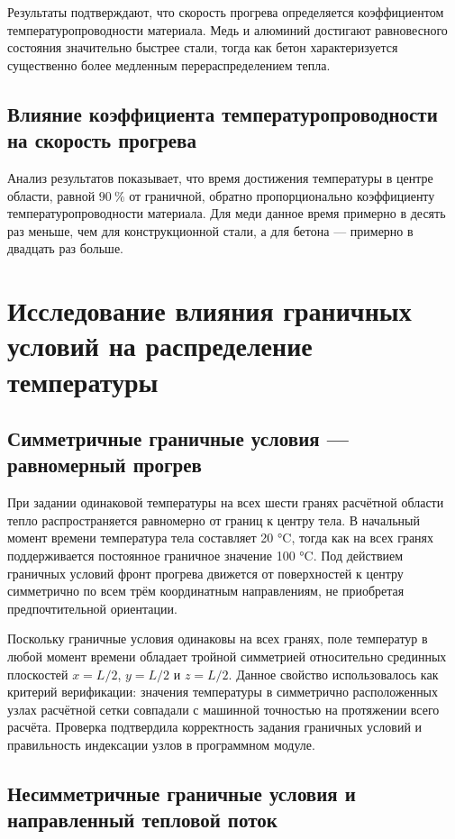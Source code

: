 Результаты подтверждают, что скорость прогрева определяется 
коэффициентом температуропроводности материала. Медь и алюминий 
достигают равновесного состояния значительно быстрее стали, 
тогда как бетон характеризуется существенно более медленным 
перераспределением тепла.

\subsection{Влияние коэффициента температуропроводности на скорость прогрева}

Анализ результатов показывает, что время достижения температуры 
в центре области, равной $90~\%$ от граничной, обратно 
пропорционально коэффициенту температуропроводности материала. 
Для меди данное время примерно в десять раз меньше, чем для 
конструкционной стали, а для бетона --- примерно в двадцать раз 
больше. 

\section{Исследование влияния граничных условий на распределение температуры}

\subsection{Симметричные граничные условия --- равномерный прогрев}

При задании одинаковой температуры на всех шести гранях
расчётной области тепло распространяется равномерно от
границ к центру тела. В начальный момент времени температура
тела составляет 20 °C, тогда как на всех гранях
поддерживается постоянное граничное значение
 100 °C. Под действием граничных условий фронт
прогрева движется от поверхностей к центру симметрично
по всем трём координатным направлениям, не приобретая
предпочтительной ориентации.

Поскольку граничные условия одинаковы на всех гранях,
поле температур в любой момент времени обладает тройной
симметрией относительно срединных плоскостей $x = L/2$,
$y = L/2$ и $z = L/2$. Данное свойство использовалось
как критерий верификации: значения температуры в
симметрично расположенных узлах расчётной сетки
совпадали с машинной точностью на протяжении всего
расчёта. Проверка подтвердила корректность задания
граничных условий и правильность индексации узлов в
программном модуле.

\subsection{Несимметричные граничные условия и направленный тепловой поток}

